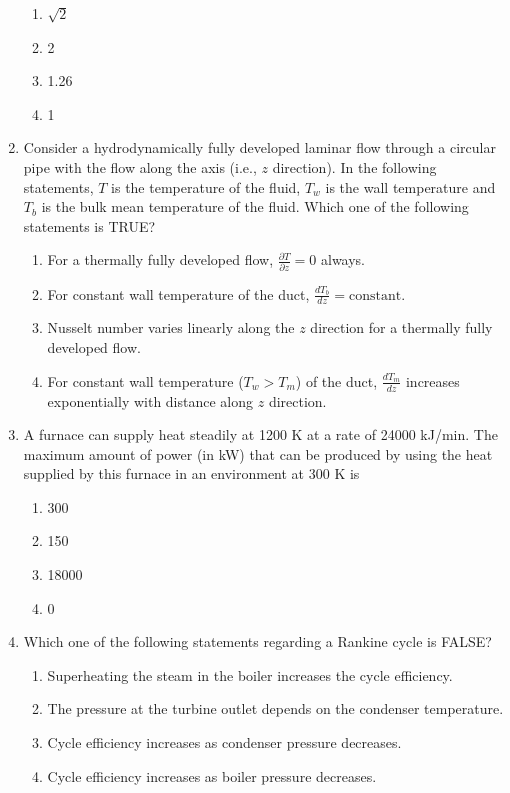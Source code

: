 \documentclass[journal,11pt,onecolumn]{IEEEtran}
\begin{document}
\begin{enumerate}[resume]
          \begin{enumerate}
              \item $\sqrt{2}$
              \item 2
              \item 1.26
              \item 1
          \end{enumerate}

    \item Consider a hydrodynamically fully developed laminar flow through a circular pipe with the flow along the axis (i.e., $z$ direction). In the following statements, $T$ is the temperature of the fluid, $T_w$ is the wall temperature and $T_b$ is the bulk mean temperature of the fluid. Which one of the following statements is TRUE?

          \begin{enumerate}
              \item For a thermally fully developed flow, $\frac{\partial T}{\partial z} = 0$ always.
              \item For constant wall temperature of the duct, $\frac{dT_b}{dz} = \text{constant}$.
              \item Nusselt number varies linearly along the $z$ direction for a thermally fully developed flow.
              \item For constant wall temperature ($T_w > T_m$) of the duct, $\frac{dT_m}{dz}$ increases exponentially with distance along $z$ direction.
          \end{enumerate}

    \item A furnace can supply heat steadily at 1200 K at a rate of 24000 kJ/min. The maximum amount of power (in kW) that can be produced by using the heat supplied by this furnace in an environment at 300 K is

          \begin{enumerate}
              \item 300
              \item 150
              \item 18000
              \item 0
          \end{enumerate}

    \item Which one of the following statements regarding a Rankine cycle is FALSE?

          \begin{enumerate}
              \item Superheating the steam in the boiler increases the cycle efficiency.
              \item The pressure at the turbine outlet depends on the condenser temperature.
              \item Cycle efficiency increases as condenser pressure decreases.
              \item Cycle efficiency increases as boiler pressure decreases.
          \end{enumerate}


\end{enumerate}
\end{document}
